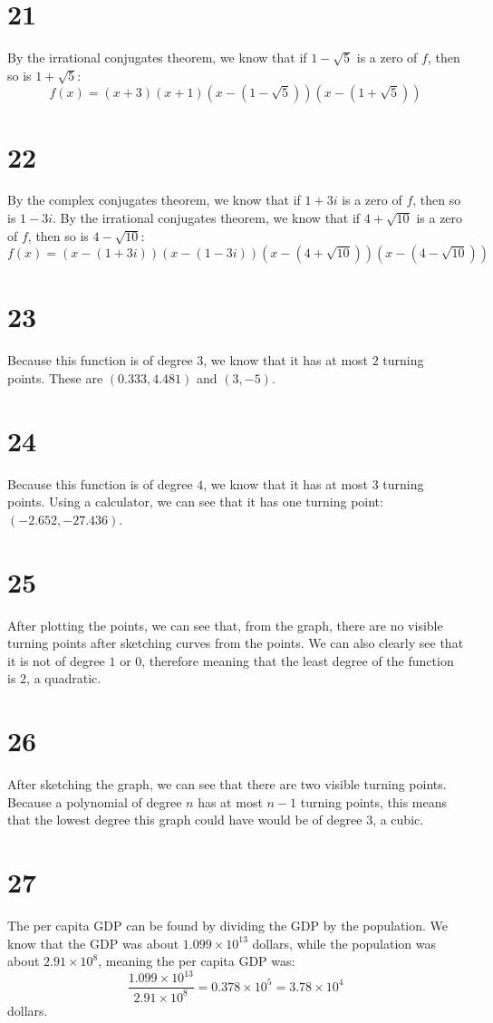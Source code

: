 \documentclass{article}
\theoremstyle{definition}
\begin{document}
\section*{21}
By the irrational conjugates theorem, we know that if $1-\sqrt{5}$ is a zero of $f$, then so is $1+\sqrt{5}$:
\[ f(x)=(x+3)(x+1)(x-(1-\sqrt{5}))(x-(1+\sqrt{5})) \]

\section*{22}
By the complex conjugates theorem, we know that if $1+3i$ is a zero of $f$, then so is $1-3i$. By the irrational conjugates theorem, we know that if 
$4+\sqrt{10}$ is a zero of $f$, then so is $4-\sqrt{10}$:
\[ f(x)=(x-(1+3i))(x-(1-3i))(x-(4+\sqrt{10}))(x-(4-\sqrt{10})) \]

\section*{23}
Because this function is of degree $3$, we know that it has at most $2$ turning points. These are $(0.333,4.481)$ and $(3,-5)$.

\section*{24}
Because this function is of degree $4$, we know that it has at most $3$ turning points. Using a calculator, we can see that it has one turning point:
$(-2.652,-27.436)$.

\section*{25}
After plotting the points, we can see that, from the graph, there are no visible turning points after sketching curves from the points. We can also 
clearly see that it is not of degree $1$ or $0$, therefore meaning that the least degree of the function is $2$, a quadratic.

\section*{26}
After sketching the graph, we can see that there are two visible turning points. Because a polynomial of degree $n$ has at most $n-1$ turning points, 
this means that the lowest degree this graph could have would be of degree $3$, a cubic.

\section*{27}
The per capita GDP can be found by dividing the GDP by the population. We know that the GDP was about $1.099\times 10^{13}$ dollars, while the 
population was about $2.91\times 10^8$, meaning the per capita GDP was:
\[ \frac{1.099\times 10^{13}}{2.91\times 10^8}=0.378\times 10^5=3.78\times 10^4 \] dollars.
\end{document}

